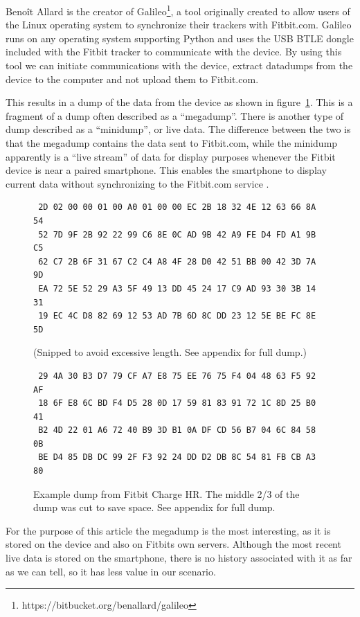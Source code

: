 \documentclass[a4paper,11pt,dvips]{article}
\begin{document}
Benoît Allard is the creator of Galileo\footnote{https://bitbucket.org/benallard/galileo}, a tool originally created to allow users of the Linux operating system to synchronize their trackers with Fitbit.com. Galileo runs on any operating system supporting Python and uses the USB BTLE dongle included with the Fitbit tracker to communicate with the device. By using this tool we can initiate communications with the device, extract datadumps from the device to the computer and not upload them to Fitbit.com.

This results in a dump of the data from the device as shown in figure~\ref{fig:megadump}. This is a fragment of a dump often described as a “megadump”. There is another type of dump described as a “minidump”, or live data. The difference between the two is that the megadump contains the data sent to Fitbit.com, while the minidump apparently is a “live stream” of data for display purposes whenever the Fitbit device is near a paired smartphone. This enables the smartphone to display current data without synchronizing to the Fitbit.com service \citep{cyr2014security, Aprville:2015a}.

\begin{figure}
\begin{verbatim}
 2D 02 00 00 01 00 A0 01 00 00 EC 2B 18 32 4E 12 63 66 8A 54
 52 7D 9F 2B 92 22 99 C6 8E 0C AD 9B 42 A9 FE D4 FD A1 9B C5
 62 C7 2B 6F 31 67 C2 C4 A8 4F 28 D0 42 51 BB 00 42 3D 7A 9D
 EA 72 5E 52 29 A3 5F 49 13 DD 45 24 17 C9 AD 93 30 3B 14 31
 19 EC 4C D8 82 69 12 53 AD 7B 6D 8C DD 23 12 5E BE FC 8E 5D
\end{verbatim}
(Snipped to avoid excessive length. See appendix for full dump.)
\begin{verbatim}
 29 4A 30 B3 D7 79 CF A7 E8 75 EE 76 75 F4 04 48 63 F5 92 AF
 18 6F E8 6C BD F4 D5 28 0D 17 59 81 83 91 72 1C 8D 25 B0 41
 B2 4D 22 01 A6 72 40 B9 3D B1 0A DF CD 56 B7 04 6C 84 58 0B
 BE D4 85 DB DC 99 2F F3 92 24 DD D2 DB 8C 54 81 FB CB A3 80
\end{verbatim}
\caption{Example dump from Fitbit Charge HR. The middle 2/3 of the dump was cut to save space. See appendix for full dump.}
\label{fig:megadump}
\end{figure}

For the purpose of this article the megadump is the most interesting, as it is stored on the device and also on Fitbits own servers. Although the most recent live data is stored on the smartphone, there is no history associated with it as far as we can tell, so it has less value in our scenario.
\end{document}

